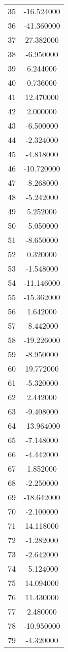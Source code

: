 \documentclass[12pt]{article}
\begin{document}
\begin{longtable}{@{}cc@{}}
35 & -16.524000 \\
36 & -41.360000 \\
37 & 27.382000 \\
38 & -6.950000 \\
39 & 6.244000 \\
40 & 0.736000 \\
41 & 12.470000 \\
42 & 2.000000 \\
43 & -6.500000 \\
44 & -2.324000 \\
45 & -4.818000 \\
46 & -10.720000 \\
47 & -8.268000 \\
48 & -5.242000 \\
49 & 5.252000 \\
50 & -5.050000 \\
51 & -8.650000 \\
52 & 0.320000 \\
53 & -1.548000 \\
54 & -11.146000 \\
55 & -15.362000 \\
56 & 1.642000 \\
57 & -8.442000 \\
58 & -19.226000 \\
59 & -8.950000 \\
60 & 19.772000 \\
61 & -5.320000 \\
62 & 2.442000 \\
63 & -9.408000 \\
64 & -13.964000 \\
65 & -7.148000 \\
66 & -4.442000 \\
67 & 1.852000 \\
68 & -2.250000 \\
69 & -18.642000 \\
70 & -2.100000 \\
71 & 14.118000 \\
72 & -1.282000 \\
73 & -2.642000 \\
74 & -5.124000 \\
75 & 14.094000 \\
76 & 11.430000 \\
77 & 2.480000 \\
78 & -10.950000 \\
79 & -4.320000 \\

\end{longtable}
\end{document}
